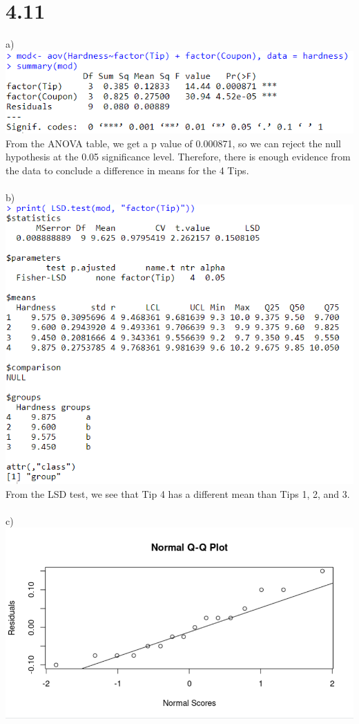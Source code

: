 \documentclass{article}
\begin{document}
\section*{4.11}
a)
\\\includegraphics{4.11a.PNG}
\\From the ANOVA table, we get a p value of 0.000871, so we can reject the null hypothesis at the 0.05 significance level. Therefore, there is enough evidence from the data to conclude a difference in means for the 4 Tips.
\\
\\b)
\\\includegraphics{4.11b.PNG}
\\From the LSD test, we see that Tip 4 has a different mean than Tips 1, 2, and 3.
\\
\\c)
\\\includegraphics{4.11cQQ.PNG}
\end{document}
